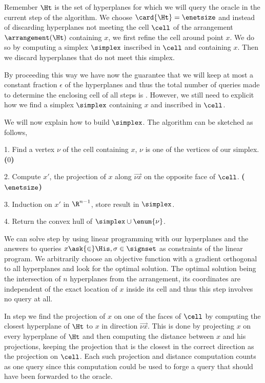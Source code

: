 Remember \(\Ht\) is the set of hyperplanes for which we will query the oracle
in the current step of the algorithm. We choose \(\card{\Ht} = \enetsize\) and
instead of discarding hyperplanes not meeting the cell $\cell$ of the
arrangement $\arrangement(\Ht)$ containing $x$, we first refine the cell around
point $x$. We do so by computing a simplex $\simplex$ inscribed in $\cell$ and
containing \(x\). Then we discard hyperplanes that do not meet this simplex.

By proceeding this way we have now the guarantee that we will keep at most a
constant fraction \(\epsilon\) of the hyperplanes and thus the total number of
queries made to determine the enclosing cell of
all steps is . However, we
still need to explicit how we find a simplex $\simplex$ containing $x$ and
inscribed in $\cell$.

We will now explain how to build $\simplex$. The algorithm can be sketched as
follows,

\begin{algorithm}
\item[1.] Find a vertex $\nu$ of the cell containing $x$, $\nu$ is one of
the vertices of our simplex. \textbf{($0$)}
\item[2.] Compute $x'$, the projection of $x$ along $\vec{\nu x}$ on the
opposite face of $\cell$. \textbf{($\enetsize$)}
\item[3.] Induction on $x'$ in $\R^{n-1}$, store result in \(\simplex\).
\item[4.] Return the convex hull of \(\simplex \cup \enum{\nu}\).
\end{algorithm}

We can solve step  by using linear programming with our  hyperplanes and the answers to queries $x \ask{\in} \His, \sigma \in
\signset$ as constraints of the linear program. We arbitrarily choose an
objective function with a gradient orthogonal to all hyperplanes and look for
the optimal solution. The optimal solution being the intersection of \(n\)
hyperplanes from the arrangement, its coordinates are independent of the exact
location of \(x\) inside its cell and thus this step involves no query at all.

In step  we find the projection of $x$ on one of the faces of
$\cell$ by computing the closest hyperplane of $\Ht$ to $x$ in direction
$\vec{\nu x}$. This is done by projecting $x$ on every hyperplane of $\Ht$ and
then computing the distance between $x$ and his projections, keeping the
projection that is the closest in the correct direction as the projection
on $\cell$. Each such projection and distance computation counts as one query
since this computation could be used to forge a query that should have been
forwarded to the oracle.

